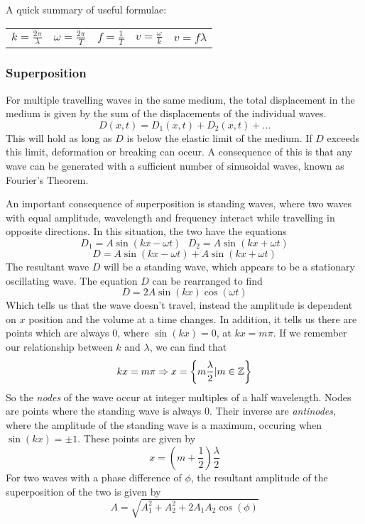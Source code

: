 \documentclass[12pt]{report}
\begin{document}
\begin{flushleft}
\bigskip
A quick summary of useful formulae:
\begin{center}
    \begin{tabular}{||c|c|c|c|c||}
        \(k = \frac{2\pi}{\lambda}\) &
        \(\omega = \frac{2\pi}{T}\) &
        \(f = \frac{1}{T}\) &
        \(v = \frac{\omega}{k}\) &
        \(v = f\lambda\) \\[7pt]  
    \end{tabular}        
\end{center}

\subsubsection*{Superposition}
For multiple travelling waves in the same medium, the total displacement in the
medium is given by the sum of the displacements of the individual waves.
\[D(x, t) = D_1(x, t) + D_2(x, t) + ...\]
This will hold as long as \(D\) is below the elastic limit of the medium. If
\(D\) exceeds this limit, deformation or breaking can occur. A consequence of
this is that any wave can be generated with a sufficient number of sinusoidal
waves, known as Fourier's Theorem.

\bigskip
An important consequence of superposition is standing waves, where two waves
with equal amplitude, wavelength and frequency interact while travelling in
opposite directions. In this situation, the two have the equations
\[D_1 = A\sin(kx - \omega t) \:\:\: D_2 = A\sin(kx + \omega t)\]
\[D = A\sin(kx - \omega t) + A\sin(kx + \omega t)\]
The resultant wave \(D\) will be a standing wave, which appears to be a 
stationary oscillating wave. The equation \(D\) can be rearranged to find
\[D = 2A\sin(kx)\cos(\omega t)\]
Which tells us that the wave doesn't travel, instead the amplitude is dependent
on \(x\) position and the volume at a time changes. In addition, it tells us 
there are points which are always \(0\), where \(\sin(kx) = 0\), at 
\(kx = m\pi\). If we remember our relationship between \(k\) and \(\lambda\),
we can find that
\[kx = m\pi \Rightarrow x = \set{m\frac{\lambda}{2} | m \in \mathbb{Z}}\]
So the \textit{nodes} of the wave occur at integer multiples of a half 
wavelength. Nodes are points where the standing wave is always \(0\). Their
inverse are \textit{antinodes}, where the amplitude of the standing wave is a
maximum, occuring when \(\sin(kx) = \pm1\). These points are given by
\[x = \left(m + \frac{1}{2}\right)\frac{\lambda}{2}\]
For two waves with a phase difference of \(\phi\), the resultant amplitude of
the superposition of the two is given by
\[A = \sqrt{A_1^2+A_2^2 + 2A_1A_2\cos(\phi)}\]


\end{flushleft}
\end{document}
